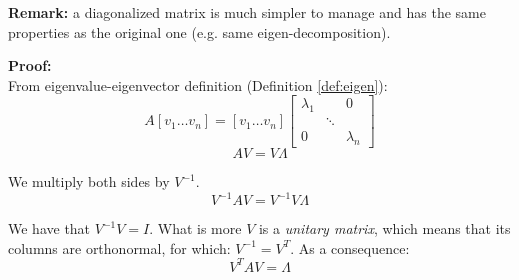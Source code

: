 \textbf{Remark:} a diagonalized matrix is much simpler to manage and has the same
properties as the original one (e.g. same eigen-decomposition).

\vspace{5mm}

\textbf{Proof:}\\ From eigenvalue-eigenvector definition (Definition
\ref{def:eigen}):
\begin{equation*}
	A[v_{1}\hdots v_{n}] = [v_{1}\hdots v_{n}]
	\begin{bmatrix}
		\lambda_{1} &        & 0           \\
		            & \ddots &             \\
		0           &        & \lambda_{n}
	\end{bmatrix}
\end{equation*}
\begin{equation*}
	AV = V \Lambda
\end{equation*}

We multiply both sides by $V^{-1}$.
\begin{equation*}
	V^{-1}AV = V^{-1}V \Lambda
\end{equation*}

We have that $V^{-1}V = I$. What is more $V$ is a \textit{unitary matrix}, which
means that its columns are orthonormal, for which: $V^{-1}= V^{T}$. As a consequence:
\begin{equation*}
	V^{T}AV = \Lambda
\end{equation*}



